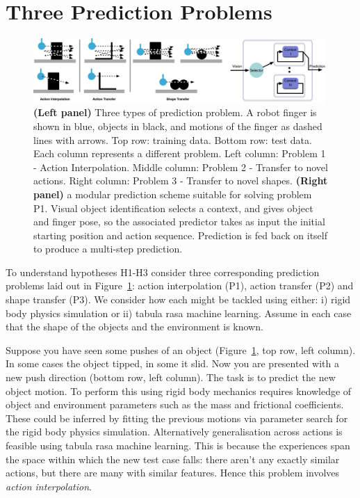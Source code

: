 \section{Three Prediction Problems	}
\label{sec:schema}

\begin{figure}[t]
\centerline{\includegraphics[width=0.99\textwidth]{three-prediction-problems-1}}
\caption{{\bf (Left panel)} Three types of prediction problem. A robot finger is shown in blue, objects in black, and motions of the finger as dashed lines with arrows. Top row: training data. Bottom row: test data. Each column represents a different problem. Left column: Problem 1 - Action Interpolation. Middle column: Problem 2 - Transfer to novel actions. Right column: Problem 3 - Transfer to novel shapes. {\bf (Right panel)} a modular prediction scheme suitable for solving problem P1. Visual object identification selects a context, and gives object and finger pose, so the associated predictor takes as input the initial starting position and action sequence. Prediction is fed back on itself to produce a multi-step prediction.}
\label{fig:three-prediction-problems}
\end{figure}

To understand hypotheses H1-H3 consider three corresponding prediction problems laid out in Figure~\ref{fig:three-prediction-problems}: action interpolation (P1), action transfer (P2) and shape transfer (P3). We consider how each might be tackled using either: i) rigid body physics simulation or ii) tabula rasa machine learning. Assume in each case that the shape of the objects and the environment is known.

 Suppose you have seen some pushes of an object (Figure~\ref{fig:three-prediction-problems}, top row, left column). In some cases the object tipped, in some it slid. Now you are presented with a new push direction (bottom row, left column). The task is to predict the new object motion. To perform this using rigid body mechanics requires knowledge of object and environment parameters such as the mass and frictional coefficients. These could be inferred by fitting the previous motions via parameter search for the rigid body physics simulation. Alternatively generalisation across actions is feasible using tabula rasa machine learning. This is because the experiences span the space within which the new test case falls: there aren't any exactly similar actions, but there are many with similar features. Hence this problem involves {\em action interpolation}.

